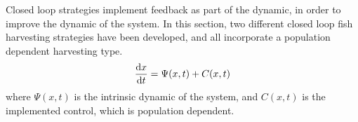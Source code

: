 Closed loop strategies implement feedback as part of the dynamic, in order to improve the dynamic of the system. In this section, two different closed loop fish harvesting strategies have been developed, and all incorporate a population dependent harvesting type.
\begin{equation}
\frac{\mathrm{d} x}{{\mathrm{d} t}}=\Psi(x,t)+C(x,t)
\end{equation}
where $\Psi(x,t)$ is the intrinsic dynamic of the system, and $C(x,t)$ is the implemented control, which is population dependent.